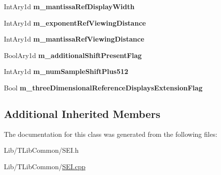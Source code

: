 \begin{DoxyCompactItemize}
Int\+Ary1d {\bfseries m\+\_\+mantissa\+Ref\+Display\+Width}
\item 
\mbox{\label{class_s_e_i_three_dimensional_reference_displays_info_a73a6b7f042068b066a048c43e554b12a}} 
Int\+Ary1d {\bfseries m\+\_\+exponent\+Ref\+Viewing\+Distance}
\item 
\mbox{\label{class_s_e_i_three_dimensional_reference_displays_info_a202be31b52c9378b7a186787233ecdd2}} 
Int\+Ary1d {\bfseries m\+\_\+mantissa\+Ref\+Viewing\+Distance}
\item 
\mbox{\label{class_s_e_i_three_dimensional_reference_displays_info_a071173795049332c5c08aa7e8369b2df}} 
Bool\+Ary1d {\bfseries m\+\_\+additional\+Shift\+Present\+Flag}
\item 
\mbox{\label{class_s_e_i_three_dimensional_reference_displays_info_ad8147581702b25da42026ebba2cde696}} 
Int\+Ary1d {\bfseries m\+\_\+num\+Sample\+Shift\+Plus512}
\item 
\mbox{\label{class_s_e_i_three_dimensional_reference_displays_info_af6c27c60b25814e82a5448da478ba8b2}} 
Bool {\bfseries m\+\_\+three\+Dimensional\+Reference\+Displays\+Extension\+Flag}
\end{DoxyCompactItemize}
\subsection*{Additional Inherited Members}


The documentation for this class was generated from the following files\+:\begin{DoxyCompactItemize}
\item 
Lib/\+T\+Lib\+Common/S\+E\+I.\+h\item 
Lib/\+T\+Lib\+Common/\hyperlink{_s_e_i_8cpp}{S\+E\+I.\+cpp}\end{DoxyCompactItemize}
